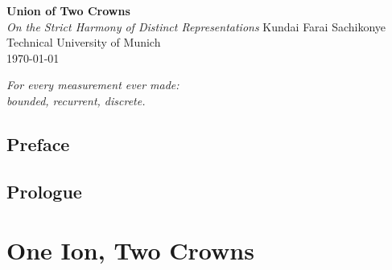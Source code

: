 \documentclass[12pt, twoside, openright]{book}
\theoremstyle{definition}
\theoremstyle{remark}
\begin{document}
\frontmatter

\begin{titlepage}
  \vspace*{4cm}
  \begin{flushright}
    {\Huge\bfseries\color{crownblue} Union of Two Crowns}\\[1.5ex]
    {\large\itshape On the Strict Harmony of Distinct Representations\/}
    \vfill
    {\large Kundai Farai Sachikonye}\\[0.5ex]
    {\normalsize Technical University of Munich}\\[3ex]
    {\normalsize\today}
  \end{flushright}
\end{titlepage}

\cleardoublepage
\vspace*{\fill}
\begin{center}
\itshape
For every measurement ever made:\\
bounded, recurrent, discrete.
\end{center}
\vspace*{\fill}
\cleardoublepage

\chapter*{Preface}


\chapter*{Prologue}


\tableofcontents
\listoffigures
\listoftables

\mainmatter

\part{One Ion, Two Crowns}
\label{part:opening}
\end{document}
